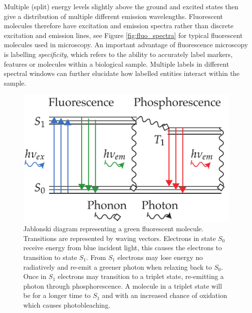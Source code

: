 Multiple (split) energy levels slightly above the ground and excited states then give a distribution of multiple different emission wavelengths.
Fluorescent molecules therefore have excitation and emission spectra rather than discrete excitation and emission lines, see Figure \ref{fig:fluo_spectra} for typical fluorescent molecules used in microscopy.
An important advantage of fluorescence microscopy is labelling \emph{\gls{specificity}}, which refers to the ability to accurately label markers, features or molecules within a biological sample.
Multiple labels in different spectral windows can further elucidate how labelled entities interact within the sample.

\begin{figure}
    \centering
    \includegraphics{jablonski_triplet_newer}
    \caption[Standard jablonski diagram]{
    Jablonski diagram representing a green fluorescent molecule.
    Transitions are represented by waving vectors.
    Electrons in state $S_0$ receive energy from blue incident light,
    this causes the electrons to transition to state $S_1$.
    From $S_1$ electrons may lose energy no radiatively and re-emit a greener photon when relaxing back to $S_0$.
    Once in $S_1$ electrons may transition to a triplet state, re-emitting a photon through phosphorescence.
    A molecule in a triplet state will be for a longer time to $S_1$ and with an increased chance of oxidation which causes photobleaching.%
        }
    \label{fig:jablonski_triplet_new}
\end{figure}


